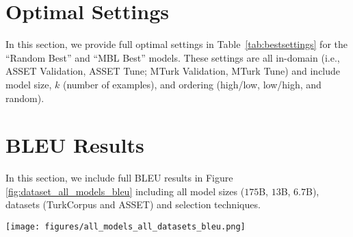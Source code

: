 \documentclass[11pt]{article}
\begin{document}



\clearpage
\appendix

\section{Optimal Settings}
\label{sec:optimalsettings}

In this section, we provide full optimal settings in Table~\ref{tab:bestsettings} for the ``Random Best'' and ``MBL Best'' models. These settings are all in-domain (i.e., ASSET Validation, ASSET Tune; MTurk Validation, MTurk Tune) and include model size, $k$ (number of examples), and ordering (high/low, low/high, and random).



\begin{table}[!htp]
\caption{MBL-Best and Random-Best settings for results}
\label{tab:bestsettings}
\end{table}

\section{BLEU Results}
\label{sec:bleuresults}

In this section, we include full BLEU results in Figure \ref{fig:dataset_all_models_bleu} including all model sizes ($175$B, $13$B, $6.7$B), datasets (TurkCorpus and ASSET) and selection techniques. 

\begin{figure*}[ht]
    \centering  
    \texttt{[image: figures/all\_models\_all\_datasets\_bleu.png]}
    \caption{BLEU scores for GPT-6.5, GPT-13B and GPT-175B models on ASSET (top) and TurkCorpus (bottom) datasets.}
    \label{fig:dataset_all_models_bleu}
\end{figure*}
\end{document}
